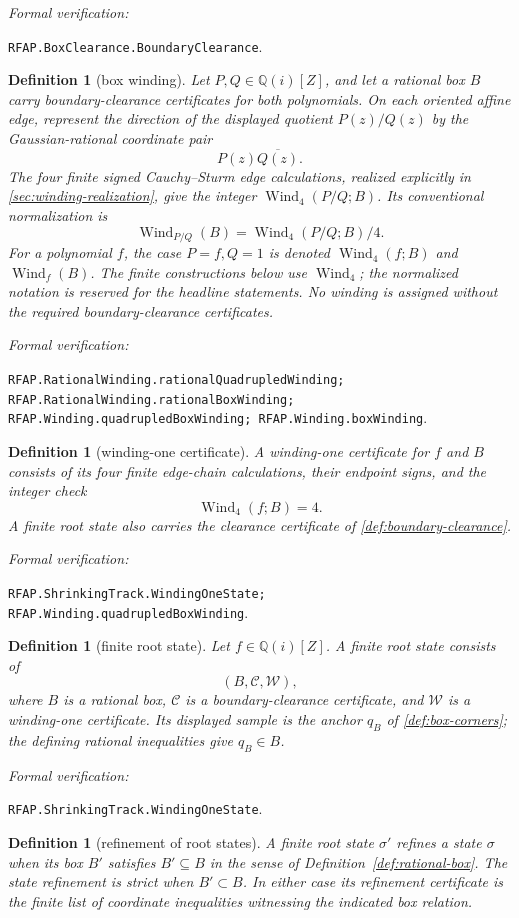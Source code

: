 \documentclass[11pt]{article}
\newtheorem{definition}[theorem]{Definition}
\newcommand{\Qi}{\mathbb{Q}(i)}
\newcommand{\Wind}{\operatorname{Wind}}
\newcommand{\Defref}[1]{Definition~\ref{#1}}
\newcommand{\leanref}[1]{\par\smallskip\noindent
  \emph{Formal verification:}\par\nobreak
  {\raggedright\nolinkurl{#1}.\par}}
\begin{document}
\leanref{RFAP.BoxClearance.BoundaryClearance}

\begin{definition}[box winding]
\label{def:rational-function-winding}
Let $P,Q\in\Qi[Z]$, and let a rational box $B$ carry boundary-clearance
certificates for both polynomials.  On each oriented affine edge, represent
the direction of the displayed quotient $P(z)/Q(z)$ by the
Gaussian-rational coordinate pair
\[
                         P(z)\overline{Q(z)}.
\]
The four finite signed Cauchy--Sturm edge calculations,
realized explicitly in \cref{sec:winding-realization}, give the integer
$\Wind_4(P/Q;B)$.  Its conventional normalization is
\[
                         \Wind_{P/Q}(B)=\Wind_4(P/Q;B)/4.
\]
For a polynomial $f$, the case $P=f,Q=1$ is denoted
$\Wind_4(f;B)$ and $\Wind_f(B)$.  The finite constructions below use
$\Wind_4$; the normalized notation is reserved for the headline statements.
No winding is assigned without the required boundary-clearance certificates.
\end{definition}

\leanref{RFAP.RationalWinding.rationalQuadrupledWinding;
RFAP.RationalWinding.rationalBoxWinding;
RFAP.Winding.quadrupledBoxWinding; RFAP.Winding.boxWinding}

\begin{definition}[winding-one certificate]
\label{def:winding-one-certificate}
A \emph{winding-one certificate} for $f$ and $B$ consists of its four finite
edge-chain calculations, their endpoint signs, and the integer check
\[
                           \Wind_4(f;B)=4.
\]
A finite root state also carries the clearance certificate of
\cref{def:boundary-clearance}.
\end{definition}

\leanref{RFAP.ShrinkingTrack.WindingOneState;
RFAP.Winding.quadrupledBoxWinding}

\begin{definition}[finite root state]
\label{def:finite-root-state}
Let $f\in\Qi[Z]$.  A \emph{finite root state} consists of
\[
       (B,\mathcal C,\mathcal W),
\]
where $B$ is a rational box, $\mathcal C$ is a boundary-clearance
certificate, and $\mathcal W$ is a winding-one certificate.
Its displayed sample is the anchor $q_B$ of
\cref{def:box-corners}; the defining rational inequalities give
$q_B\in B$.
\end{definition}

\leanref{RFAP.ShrinkingTrack.WindingOneState}

\begin{definition}[refinement of root states]
\label{def:root-state-refinement}
A finite root state $\sigma'$ \emph{refines} a state $\sigma$ when its box
$B'$ satisfies $B'\subseteq B$ in the sense of
\Defref{def:rational-box}.  The state refinement is \emph{strict} when
$B'\subset B$.  In either case its refinement certificate is the finite list
of coordinate inequalities witnessing the indicated box relation.
\end{definition}
\end{document}
